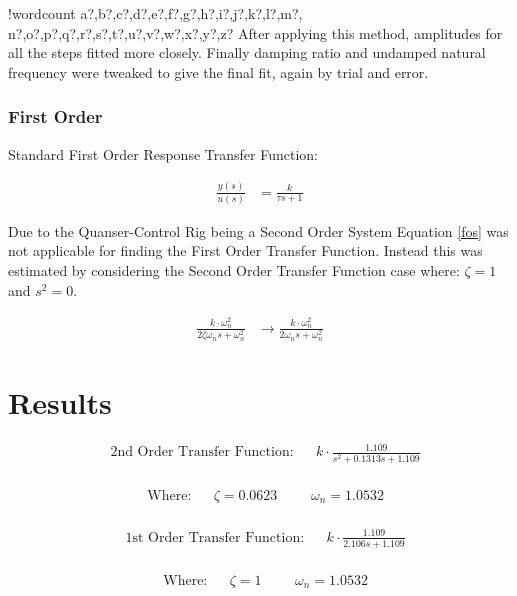 \documentclass[11pt]{article}
\newcounter{words}
\newenvironment{counted}{%
  \setcounter{words}{0}
  \SearchList!{wordcount}{\stepcounter{words}}
    {a?,b?,c?,d?,e?,f?,g?,h?,i?,j?,k?,l?,m?,
    n?,o?,p?,q?,r?,s?,t?,u?,v?,w?,x?,y?,z?}
  \UndoBoundary{'}
  \SearchOrder{p;}}{%
  \StopSearching}
\begin{document}
\begin{counted}
After applying this method, amplitudes for all the steps fitted more
closely. Finally damping ratio and undamped natural frequency were
tweaked to give the final fit, again by trial and error.

\subsubsection{First Order}\label{first-order}

Standard First Order Response Transfer Function:

\begin{align}
 \frac { y(s) }{ u(s) } &=\frac { k }{ \tau s+1 }
\label{fos}
\end{align}

Due to the Quanser-Control Rig being a Second Order System Equation
\ref{fos} was not applicable for finding the First Order Transfer
Function. Instead this was estimated by considering the Second Order
Transfer Function case where: \(\zeta =1\) and \(s^2=0\).

\begin{align}
\frac { k\cdot \omega_{ n }^{ 2 } }{ 2\zeta \omega_{ n }s+\omega_{ n }^{ 2 } } &\rightarrow \frac { k\cdot \omega_{ n }^{ 2 } }{ 2\omega_{ n }s+\omega_{ n }^{ 2 } }
\end{align}

\section{Results}\label{results}

\begin{align}
&\text{2nd Order Transfer Function}: && k \cdot \frac { 1.109 }{ s^{ 2 }+0.1313s+1.109 }
\end{align}

\begin{align*}
\\
&\text{Where:} &&\zeta = 0.0623 &&& \omega_n = 1.0532
\\
\end{align*}

\begin{align}
&\text{1st Order Transfer Function}: && k \cdot \frac { 1.109 }{ 2.106s+1.109 }
\end{align}

\begin{align*}
\\
&\text{Where:} &&\zeta = 1 &&& \omega_n = 1.0532
\\
\end{align*}


\end{counted}
\end{document}
